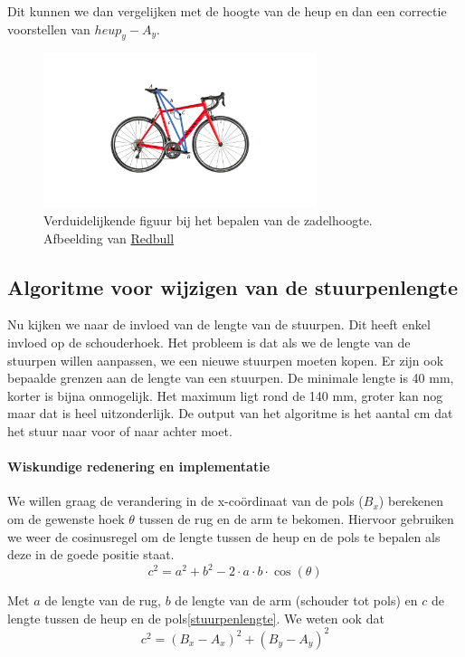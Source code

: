 \documentclass[a4paper,twoside,kulak]{kulakreport}
\begin{document}
Dit kunnen we dan vergelijken met de hoogte van de heup en dan een correctie voorstellen van \(heup_y - A_y\).
\begin{figure}[H]
	\begin{center}
		\includegraphics[width=8cm]{fiets.pdf}
	\end{center}
	\caption{Verduidelijkende figuur bij het bepalen van de zadelhoogte. Afbeelding van \href{redbull.com}{Redbull}}
	\label{fiets}
\end{figure}

\subsection{Algoritme voor wijzigen van de stuurpenlengte}

Nu kijken we naar de invloed van de lengte van de stuurpen. Dit heeft enkel invloed op de schouderhoek. Het probleem is dat als we de lengte van de stuurpen willen aanpassen, we een nieuwe stuurpen moeten kopen. Er zijn ook bepaalde grenzen aan de lengte van een stuurpen. De minimale lengte is 40 \si{mm}, korter is bijna onmogelijk. Het maximum ligt rond de 140 \si{mm}, groter kan nog maar dat is heel uitzonderlijk. De output van het algoritme is het aantal \si{cm} dat het stuur naar voor of naar achter moet.


\paragraph{Wiskundige redenering en implementatie}


We willen graag de verandering in de x-coördinaat van de pols (\(B_x\)) berekenen om de gewenste hoek $\theta$ tussen de rug en de arm te bekomen. Hiervoor gebruiken we weer de cosinusregel om de lengte tussen de heup en de pols te bepalen als deze in de goede positie staat.
\[c^2 = a^2 + b^2 -2\cdot a\cdot b\cdot \cos(\theta)\]

Met \(a\) de lengte van de rug, \(b\) de lengte van de arm (schouder tot pols) en \(c\) de lengte tussen de heup en de pols\ref{stuurpenlengte}. We weten ook dat
\[c^2 = (B_x - A_x)^2 + (B_y - A_y)^2\]
\end{document}
